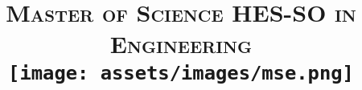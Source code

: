 \usepackage{fancyhdr}

\pagestyle{fancy}

\lhead{\small\assignmentTitle\ }
\lfoot{}
\rfoot{}

\renewcommand\headrulewidth{0.5pt}


\usepackage{titlesec}

\titleformat{\section}{\Large\bfseries}{\thesection}{6pt}{}


\author{\textbf{\assignmentAuthorName}} %
\date{} %

\title{
    \textsc{\LARGE Master of Science HES-SO in Engineering}\\[1.5cm] %
    \texttt{[image: assets/images/mse.png]}\\
    \thispagestyle{empty} %
    \vspace{0.1\textheight} %
    \textbf{\assignmentTitle}\\[4pt]
    \ifdef{\assignmentDueDate}{{\assignmentDueDate}\\}{} %
    \ifdef{\assignmentClassInstructor}{{\large \textit{\assignmentClassInstructor}}}{} %
    \vspace{0.32\textheight} %
}

